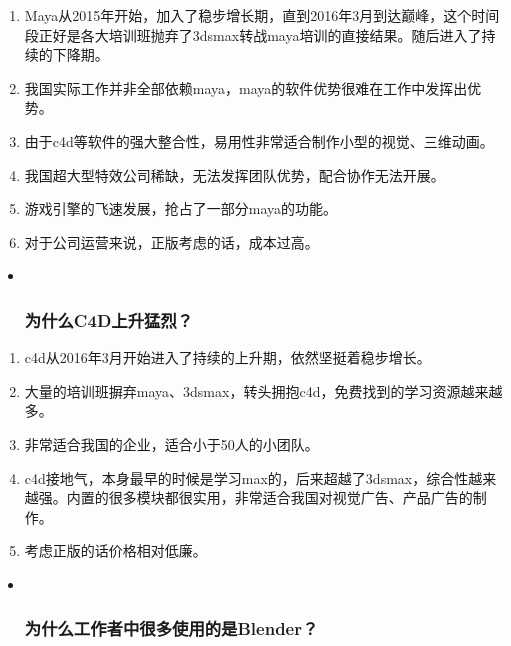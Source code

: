 \documentclass[]{article}
\begin{document}
\begin{enumerate}
\def\labelenumi{\arabic{enumi}.}
\item
  Maya从2015年开始，加入了稳步增长期，直到2016年3月到达巅峰，这个时间段正好是各大培训班抛弃了3dsmax转战maya培训的直接结果。随后进入了持续的下降期。
\item
  我国实际工作并非全部依赖maya，maya的软件优势很难在工作中发挥出优势。
\item
  由于c4d等软件的强大整合性，易用性非常适合制作小型的视觉、三维动画。
\item
  我国超大型特效公司稀缺，无法发挥团队优势，配合协作无法开展。
\item
  游戏引擎的飞速发展，抢占了一部分maya的功能。
\item
  对于公司运营来说，正版考虑的话，成本过高。
\end{enumerate}

\begin{itemize}
\item ~
  \subsubsection{\texorpdfstring{\textbf{为什么C4D上升猛烈？}}{为什么C4D上升猛烈？}}\label{header-n128}
\end{itemize}

\begin{enumerate}
\def\labelenumi{\arabic{enumi}.}
\item
  c4d从2016年3月开始进入了持续的上升期，依然坚挺着稳步增长。
\item
  大量的培训班摒弃maya、3dsmax，转头拥抱c4d，免费找到的学习资源越来越多。
\item
  非常适合我国的企业，适合小于50人的小团队。
\item
  c4d接地气，本身最早的时候是学习max的，后来超越了3dsmax，综合性越来越强。内置的很多模块都很实用，非常适合我国对视觉广告、产品广告的制作。
\item
  考虑正版的话价格相对低廉。
\end{enumerate}

\begin{itemize}
\item ~
  \subsubsection{\texorpdfstring{\textbf{为什么工作者中很多使用的是Blender？}}{为什么工作者中很多使用的是Blender？}}\label{header-n142}
\end{itemize}
\end{document}
